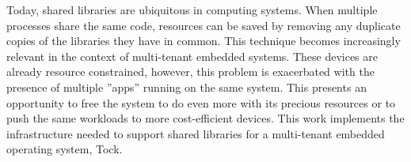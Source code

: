 \documentclass[12pt]{ucsddissertation}
\begin{document}
%
%

\begin{dissertationabstract}
Today, shared libraries are ubiquitous in computing systems. When multiple processes share the same code, resources can be saved by removing any duplicate copies of the libraries they have in common. This technique becomes increasingly relevant in the context of multi-tenant embedded systems. These devices are already resource constrained, however, this problem is exacerbated with the presence of multiple ”apps” running on the same system. This presents an opportunity to free the system to do even more with its precious resources or to push the same workloads to more cost-efficient devices. This work implements the infrastructure needed to support shared libraries for a multi-tenant embedded operating system, Tock.
\end{dissertationabstract}
\end{document}
